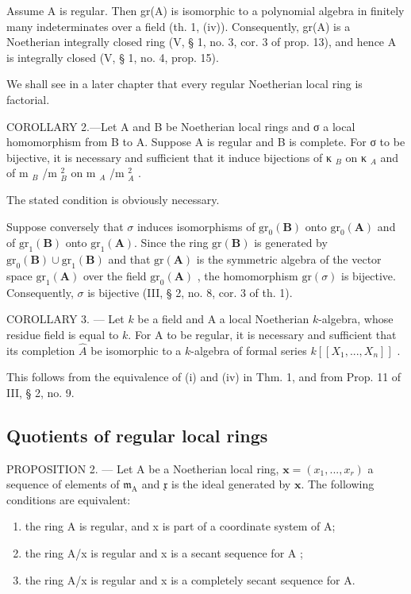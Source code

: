 Assume A is regular. Then gr(A) is isomorphic to a polynomial algebra in finitely many indeterminates over a field (th. 1, (iv)). Consequently, gr(A) is a Noetherian integrally closed ring (V, § 1, no. 3, cor. 3 of prop. 13), and hence A is integrally closed (V, § 1, no. 4, prop. 15).

We shall see in a later chapter that every regular Noetherian local ring is factorial.

COROLLARY 2.---Let A and B be Noetherian local rings and σ a local homomorphism from B to A. Suppose A is regular and B is complete. For σ to be bijective, it is necessary and sufficient that it induce bijections of κ \(_{B}\) on κ \(_{A}\) and of m \(_{B}\) /m \(_{B}^{2}\) on m \(_{A}\) /m \(_{A}^{2}\) .

The stated condition is obviously necessary.

Suppose conversely that \(\sigma\) induces isomorphisms of \(\mathrm{gr}_{0}(\mathbf{B})\) onto \(\mathrm{gr}_{0}(\mathbf{A})\) and of \(\mathrm{gr}_{1}(\mathbf{B})\) onto \(\mathrm{gr}_{1}(\mathbf{A})\). Since the ring \(\mathrm{gr}(\mathbf{B})\) is generated by \(\mathrm{gr}_{0}(\mathbf{B}) \cup \mathrm{gr}_{1}(\mathbf{B})\) and that \(\mathrm{gr}(\mathbf{A})\) is the symmetric algebra of the vector space \(\mathrm{gr}_{1}(\mathbf{A})\) over the field \(\mathrm{gr}_{0}(\mathbf{A})\) , the homomorphism \(\mathrm{gr}(\sigma)\) is bijective. Consequently, \(\sigma\) is bijective (III, § 2, no. 8, cor. 3 of th. 1).

COROLLARY 3. --- Let \(k\) be a field and A a local Noetherian \(k\)-algebra, whose residue field is equal to \(k\). For A to be regular, it is necessary and sufficient that its completion \(\hat{A}\) be isomorphic to a \(k\)-algebra of formal series \(k[[X_1, ..., X_n]]\) .

This follows from the equivalence of (i) and (iv) in Thm. 1, and from Prop. 11 of III, § 2, no. 9.

\subsection{Quotients of regular local rings}

PROPOSITION 2. --- Let A be a Noetherian local ring, \(\boldsymbol{x} = (x_1, ..., x_r)\) a sequence of elements of \(\mathfrak{m}_{\mathrm{A}}\) and \(\mathfrak{x}\) is the ideal generated by \(\boldsymbol{x}\). The following conditions are equivalent:

\begin{enumerate}
\def\labelenumi{(\roman{enumi})}
\item
  the ring A is regular, and x is part of a coordinate system of A;
\item
  the ring A/x is regular and x is a secant sequence for A ;
\item
  the ring A/x is regular and x is a completely secant sequence for A.
\end{enumerate}

